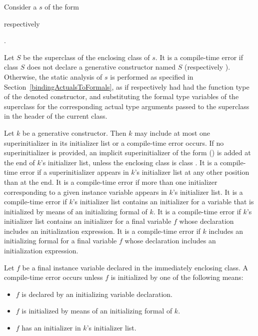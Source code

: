 \documentclass[makeidx]{article}
\begin{document}
\LMHash{}%
Consider a  $s$ of the form

respectively

.

\noindent{}%
Let $S$ be the superclass of the enclosing class of $s$.
It is a compile-time error if class $S$ does not declare a generative constructor named $S$ (respectively ).
Otherwise, the static analysis of $s$ is performed as specified in Section~\ref{bindingActualsToFormals},
as if \code{\SUPER{}} respectively 
had had the function type of the denoted constructor,
and substituting the formal type variables of the superclass
for the corresponding actual type arguments passed to the superclass
in the header of the current class.

\LMHash{}%
Let $k$ be a generative constructor.
Then $k$ may include at most one superinitializer in its initializer list or a compile-time error occurs.
If no superinitializer is provided, an implicit superinitializer of the form \SUPER{}() is added at the end of $k$'s initializer list,
unless the enclosing class is class .
It is a compile-time error if a superinitializer appears in $k$'s initializer list at any other position than at the end.
It is a compile-time error if more than one initializer corresponding to a given instance variable appears in $k$'s initializer list.
It is a compile-time error if $k$'s initializer list contains an initializer for a variable that is initialized by means of an initializing formal of $k$.
It is a compile-time error if $k$'s initializer list contains an initializer for a final variable $f$ whose declaration includes an initialization expression.
It is a compile-time error if $k$ includes an initializing formal for a final variable $f$ whose declaration includes an initialization expression.

\LMHash{}%
Let $f$ be a final instance variable declared in
the immediately enclosing class.
A compile-time error occurs unless $f$ is initialized
by one of the following means:
\begin{itemize}
\item $f$ is declared by an initializing variable declaration.
\item $f$ is initialized by means of an initializing formal of $k$.
\item $f$ has an initializer in $k$'s initializer list.
\end{itemize}
\end{document}
